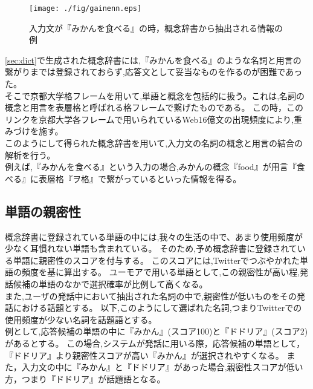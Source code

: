 \begin{figure}[tb]
 \begin{center}
  \texttt{[image: ./fig/gainenn.eps]}
  \caption{入力文が『みかんを食べる』の時，概念辞書から抽出される情報の例}
  \label{fig:gainenn}
 \end{center}
\end{figure}




\ref{sec:dict}で生成された概念辞書には,『みかんを食べる』のような名詞と用言の繋がりまでは登録されておらず,応答文として妥当なものを作るのが困難であった。\\
\hspace{1zw}そこで京都大学格フレーム\cite{Kakuframe}を用いて,単語と概念を包括的に扱う。これは,名詞の概念と用言を表層格と呼ばれる格フレームで繋げたものである。
この時，このリンクを京都大学各フレームで用いられているWeb16億文の出現頻度により,重みづけを施す。\\
\hspace{1zw}このようにして得られた概念辞書を用いて,入力文の名詞の概念と用言の結合の解析を行う。\\
\hspace{1zw}例えば,『みかんを食べる』という入力の場合,みかんの概念『food』が用言『食べる』に表層格『ヲ格』で繋がっているといった情報を得る。



\subsection{単語の親密性}\label{sec:topic}
概念辞書に登録されている単語の中には,我々の生活の中で、あまり使用頻度が少なく耳慣れない単語も含まれている。
そのため,予め概念辞書に登録されている単語に親密性のスコアを付与する。
このスコアには,Twitter\cite{Twitter}でつぶやかれた単語の頻度を基に算出する。
ユーモアで用いる単語として,この親密性が高い程,発話候補の単語のなかで選択確率が比例して高くなる。\\
\hspace{1zw}また,ユーザの発話中において抽出された名詞の中で,親密性が低いものをその発話における話題とする。
以下,このようにして選ばれた名詞,つまりTwitterでの使用頻度が少ない名詞を話題語とする。\\
\hspace{1zw}例として,応答候補の単語の中に『みかん』(スコア100)と『ドドリア』(スコア2)があるとする。
この場合,システムが発話に用いる際，応答候補の単語として，『ドドリア』より親密性スコアが高い『みかん』が選択されやすくなる。
また，入力文の中に『みかん』と『ドドリア』があった場合,親密性スコアが低い方，つまり『ドドリア』が話題語となる。






